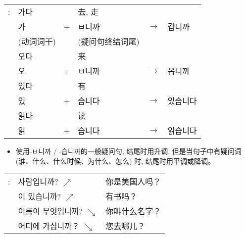 \begin{grammar}
\begin{grammarsect}
\begin{itemize}
		\end{itemize}
		\begin{tabular}{llllll}
			\kr \ruby{例}{예}: & \kr 가다 &   & 去, 走                         \\
			                 & \kr 가  & + & \kr ㅂ니까   & $\to$ & \kr 갑니까  \\
			                 & (动词词干) &   & (疑问句终结词尾)                    \\
			                 & \kr 오다 &   & 来                            \\
			                 & \kr 오  & + & \kr ㅂ니까   & $\to$ & \kr 옵니까  \\
			                 & \kr 있다 &   & 有                            \\
			                 & \kr 있  & + & \kr 습니다   & $\to$ & \kr 있습니다 \\
			                 & \kr 읽다 &   & 读                            \\
			                 & \kr 읽  & + & \kr 습니다   & $\to$ & \kr 읽습니다 \\
		\end{tabular}
	\end{grammarsect}
	\begin{itemize}
		\item 使用{\kr -ㅂ니까 / -습니까}的一般疑问句, 结尾时用升调, 但是当句子中有疑问词 (谁、什么、什么时候、为什么、怎么) 时, 结尾时用平调或降调。
	\end{itemize}
	\begin{tabular}{lll}
		\kr \ruby{例}{예}: & \kr \ruby{美國}{미국} 사람입니까? $\nearrow$ & 你是美国人吗？ \\
		                 & \kr \ruby{冊}{책}이 있습니까? $\nearrow$   & 有书吗？    \\
		                 & \kr 이름이 무엇입니까? $\searrow$           & 你叫什么名字？ \\
		                 & \kr 어디에 가십니까？ $\searrow$            & 您去哪儿？
	\end{tabular}\\
\end{grammar}
